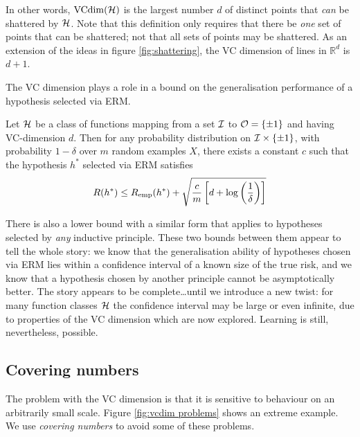 In other words, $\mathrm{VCdim}(\mathcal{H})$ is the largest number $d$ of distinct
points that \emph{can} be shattered by $\mathcal{H}$.  Note that this
definition only requires that there be \emph{one} set of points that
can be shattered; not that all sets of points may be shattered.  As an
extension of the ideas in figure \ref{fig:shattering}, the VC
dimension of lines in $\mathbb{R}^d$ is $d+1$.

The VC dimension plays a role in a bound on the generalisation
performance of a hypothesis selected via ERM. 

\begin{theorem}
Let $\mathcal{H}$ be a class of functions mapping from a set $\mathcal{I}$ to $\mathcal{O} =
\{\pm 1\}$ and having VC-dimension $d$.  Then for any probability
distribution on $\mathcal{I} \times \{\pm 1\}$, with probability $1-\delta$
over $m$ random examples $X$, there exists a constant $c$ such that
the hypothesis $h^{\ast}$ selected via ERM satisfies
\begin{equation}
R(h^{\ast}) \leq R_{\mathrm{emp}}(h^{\ast}) + \sqrt{ \frac{c}{m} \left[ d
+ \log \left ( \frac{1}{\delta} \right) \right] }
\end{equation}
\end{theorem}

There is also a lower bound with a similar form that applies to
hypotheses selected by \emph{any} inductive principle.  These two
bounds between them appear to tell the whole story: we know that the
generalisation ability of hypotheses chosen via ERM lies within a
confidence interval of a known size of the true risk, and we know that
a hypothesis chosen by another principle cannot be asymptotically
better.  The story appears to be complete\ldots until we introduce a
new twist: for many function classes $\mathcal{H}$ the confidence interval
may be large or even infinite, due to properties of the VC dimension
which are now explored.  Learning is still, nevertheless, possible.

\subsection{Covering numbers}
\label{sec:covering numbers}

The problem with the VC dimension is that it is sensitive to behaviour
on an arbitrarily small scale.  Figure \ref{fig:vcdim problems} shows
an extreme example.  We use \emph{covering numbers} to avoid some of
these problems.

